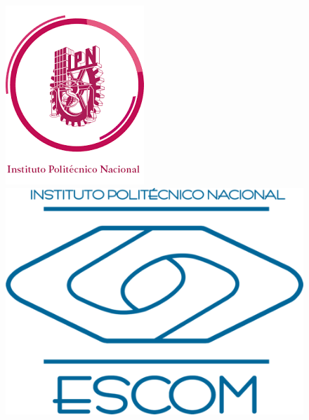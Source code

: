\begin{titlepage}
    \begin{figure}[ht!]
        \centering
        \begin{minipage}{0.2\textwidth}
            \includegraphics[width=\linewidth]{./images/logos/logoIPN}
        \end{minipage}
        \hfill 
        \begin{minipage}{0.2\textwidth}
            \includegraphics[width=\linewidth]{./images/logos/logoESCOM} 
        \end{minipage}
    \end{figure}


\end{titlepage}
